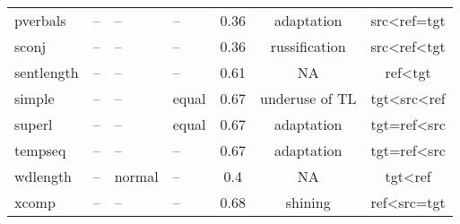 \begin{longtable}{l|p{2cm}p{2cm}p{1.5cm}ccc}
	pverbals      & -- & -- & --       & 0.36    & adaptation     & src\textless{}ref=tgt        \\
	sconj         & -- & -- & --       & 0.36    & russification  & src\textless{}ref\textless{}tgt \\
	sentlength    & -- & -- & --       & 0.61    & NA  & ref\textless{}tgt \\
	simple        & -- & -- & equal    & 0.67    & underuse of TL & tgt\textless{}src\textless{}ref \\
	superl        & -- & -- & equal    & 0.67    & adaptation     & tgt=ref\textless{}src           \\
	tempseq       & -- & -- & --       & 0.67    & adaptation     & tgt=ref\textless{}src           \\
	wdlength      & -- & normal       & --       & 0.4     & NA  & tgt\textless{}ref \\
	xcomp         & -- & -- & --       & 0.68    & shining        & ref\textless{}src=tgt
		
\end{longtable}


